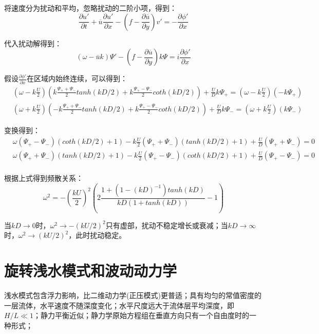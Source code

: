 \documentclass{article}
\begin{document}
将速度分为扰动和平均，忽略扰动的二阶小项，得到：
$$\frac{\partial u'}{\partial t} + \overline{u}\frac{\partial u'}{\partial x} 
 - (f-\frac{\partial \overline{u}}{\partial y})v' = -\frac{\partial\phi'}{\partial x}$$

代入扰动解得到：
$$(\omega  - \overline{u}k)\Psi' 
- (f - \frac{\partial\overline{u}}{\partial y})k\Psi = i\frac{\partial \phi'}{\partial x}$$

假设$\frac{\partial \phi'}{\partial x}$在区域内始终连续，可以得到：
\begin{align}
    & (\omega - k\frac{U}{2})(k\frac{\Psi_+ + \Psi_-}{2}tanh(kD/2) 
    + k\frac{\Psi_+ - \Psi_-}{2}coth(kD/2)) 
    + \frac{U}{D}k\Psi_+
    = (\omega - k\frac{U}{2})(-k\Psi_+) \\
    & (\omega + k\frac{U}{2})(-k\frac{\Psi_+ + \Psi_-}{2}tanh(kD/2) 
    + k\frac{\Psi_+ - \Psi_-}{2}coth(kD/2)) + \frac{U}{D}k\Psi_-
    = (\omega + k\frac{U}{2})(k\Psi_-) 
\end{align}

变换得到：
\begin{align}
    & \omega (\Psi_+ - \Psi_-)(coth(kD/2)+1)
    - k\frac{U}{2}(\Psi_+ + \Psi_-)(tanh(kD/2)+1)
    + \frac{U}{D}(\Psi_+ + \Psi_-)
    = 0 \\
    & \omega(\Psi_+ + \Psi_-)(tanh(kD/2)+1)
    - k\frac{U}{2}(\Psi_+ - \Psi_-)(coth(kD/2)+1)
    + \frac{U}{D}(\Psi_+ - \Psi_-)
    = 0 \\
\end{align}

根据上式得到频散关系：
$$\omega^2 = -(\frac{kU}{2})^2(2\frac{1+(1-(kD)^{-1})tanh(kD)}{kD(1+tanh(kD))}-1)$$

当$kD\rightarrow0$时，$\omega^2\rightarrow -(kU/2)^2$只有虚部，扰动不稳定增长或衰减；当$kD \rightarrow \infty$时，$\omega^2 \rightarrow (kU/2)^2$，此时扰动稳定。


\newpage

\section{旋转浅水模式和波动动力学}
浅水模式包含浮力影响，比二维动力学(正压模式)更普适；具有均匀的常值密度的一层流体，水平速度不随深度变化；水平尺度远大于流体层平均深度，即$H/L \ll 1$；静力平衡近似；静力学原始方程组在垂直方向只有一个自由度时的一种形式；
\end{document}

